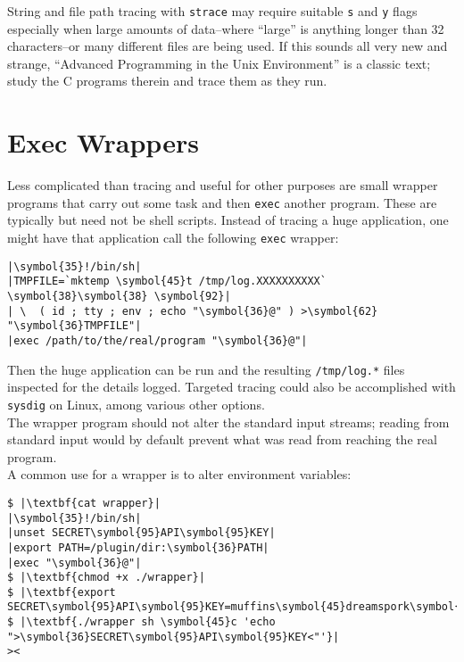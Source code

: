 \documentclass[10pt,a4paper]{article}
\begin{document}
String and file path tracing with \texttt{strace} may require suitable
\texttt{s} and \texttt{y} flags especially when
large amounts of data--where ``large'' is anything longer than 32
characters--or many different files are being used. If this sounds all
very new and strange, ``Advanced Programming in the Unix
Environment''\cite{stevens2013} is a classic text; study the C programs
therein and trace them as they run.

\section*{Exec Wrappers}

Less complicated than tracing and useful for other purposes are small
wrapper programs that carry out some task and then \texttt{exec} another
program. These are typically but need not be shell scripts. Instead of
tracing a huge application, one might have that application call the
following \texttt{exec} wrapper:

\begin{lstlisting}
|\symbol{35}!/bin/sh|
|TMPFILE=`mktemp \symbol{45}t /tmp/log.XXXXXXXXXX` \symbol{38}\symbol{38} \symbol{92}|
| \  ( id ; tty ; env ; echo "\symbol{36}@" ) >\symbol{62} "\symbol{36}TMPFILE"|
|exec /path/to/the/real/program "\symbol{36}@"|
\end{lstlisting}

Then the huge application can be run and the resulting
\texttt{/tmp/log.*} files inspected for the details logged. Targeted
tracing could also be accomplished with \texttt{sysdig} on Linux, among
various other options. \\

The wrapper program should not alter the standard input streams; reading
from standard input would by default prevent what was read from reaching
the real program. \\

A common use for a wrapper is to alter environment variables:

\begin{lstlisting}
$ |\textbf{cat wrapper}|
|\symbol{35}!/bin/sh|
|unset SECRET\symbol{95}API\symbol{95}KEY|
|export PATH=/plugin/dir:\symbol{36}PATH|
|exec "\symbol{36}@"|
$ |\textbf{chmod +x ./wrapper}|
$ |\textbf{export SECRET\symbol{95}API\symbol{95}KEY=muffins\symbol{45}dreamspork\symbol{45}hodgepodge}|
$ |\textbf{./wrapper sh \symbol{45}c 'echo ">\symbol{36}SECRET\symbol{95}API\symbol{95}KEY<"'}|
><
\end{lstlisting}
\end{document}
